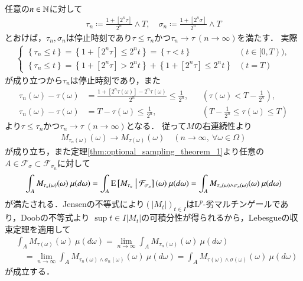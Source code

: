 	\begin{prf}
		任意の$n \in \mathbb{N}$に対して
		\begin{align}
			\tau_n \coloneqq \frac{1+[2^n \tau]}{2^n} \wedge T,
			\quad \sigma_n \coloneqq \frac{1+[2^n \sigma]}{2^n} \wedge T
		\end{align}
		とおけば，$\tau_n,\sigma_n$は停止時刻であり$\tau \leq \tau_n$かつ$\tau_n \longrightarrow \tau\ (n \longrightarrow \infty)$を満たす．
		実際
		\begin{align}
			\begin{cases}
				\left\{ \tau_n \leq t \right\} = \left\{ 1 + [2^n \tau] \leq 2^n t \right\} = \left\{ \tau < t \right\} & (t \in [0,T)), \\
				\left\{ \tau_n \leq t \right\} = \left\{ 1 + [2^n \tau] > 2^n t \right\} + \left\{ 1 + [2^n \tau] \leq 2^n t \right\} & (t = T)
			\end{cases}
		\end{align}
		が成り立つから$\tau_n$は停止時刻であり，また
		\begin{align}
				\tau_n(\omega) - \tau(\omega) &= \frac{1 + [2^n \tau(\omega)] - 2^n \tau(\omega)}{2^n} \leq \frac{1}{2^n}, && \left( \tau(\omega) < T - \frac{1}{2^n} \right), \\
				\tau_n(\omega) - \tau(\omega) &= T - \tau(\omega) \leq \frac{1}{2^n}, && \left( T - \frac{1}{2^n} \leq \tau(\omega) \leq T \right)
		\end{align}
		より$\tau \leq \tau_n$かつ$\tau_n \longrightarrow \tau\ (n \longrightarrow \infty)$となる．
		従って$M$の右連続性より
		\begin{align}
			M_{\tau_n(\omega)}(\omega) \longrightarrow M_{\tau(\omega)}(\omega)
			\quad (n \longrightarrow \infty,\ \forall \omega \in \Omega)
		\end{align}
		が成り立ち，また定理\ref{thm:optional_sampling_theorem_1}より任意の$A \in \mathcal{F}_\sigma \subset \mathcal{F}_{\sigma_n}$に対して
		\begin{align}
			\int_A M_{\tau_n(\omega)}(\omega)\ \mu(d\omega) 
			= \int_A \cexp{M_{\tau_n}}{\mathcal{F}_{\sigma_n}}(\omega)\ \mu(d\omega) 
			= \int_A M_{\tau_n(\omega)\wedge \sigma_n(\omega)}(\omega)\ \mu(d\omega) 
		\end{align}
		が満たされる．Jensenの不等式により$(|M_t|)_{t \in I}$は$\mathrm{L}^p$-劣マルチンゲールであり，Doobの不等式より
		$\sup{t \in I}{|M_t|}$の可積分性が得られるから，Lebesgueの収束定理を適用して
		\begin{align}
			&\int_A M_{\tau(\omega)}(\omega)\ \mu(d\omega) = \lim_{n \to \infty} \int_A M_{\tau_n(\omega)}(\omega)\ \mu(d\omega) \\
			&\quad = \lim_{n \to \infty} \int_A M_{\tau_n(\omega)\wedge \sigma_n(\omega)}(\omega)\ \mu(d\omega)
			= \int_A M_{\tau(\omega)\wedge \sigma(\omega)}(\omega)\ \mu(d\omega)
		\end{align}
		が成立する．
		\QED
	\end{prf}
	